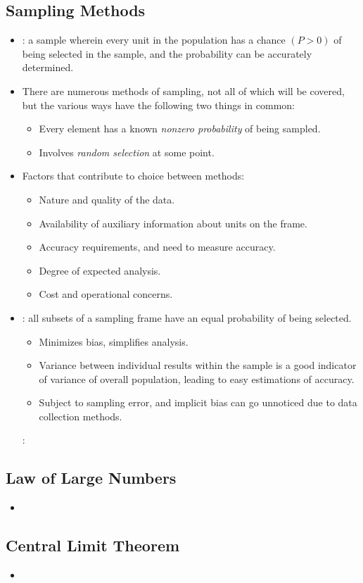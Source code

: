 \begin{itemize}
  \subsection{Sampling Methods}
  \begin{itemize}
    \item {}: a sample wherein every unit in the population has a chance \((P > 0)\) of being selected in the sample, and the probability can be accurately determined.
    \item There are numerous methods of sampling, not all of which will be covered, but the various ways have the following two things in common: 
      \begin{itemize}
        \item Every element has a known \emph{nonzero probability} of being sampled.
        \item Involves \emph{random selection} at some point.
      \end{itemize}
    \item Factors that contribute to choice between methods:
      \begin{itemize}
        \item Nature and quality of the data.
        \item Availability of auxiliary information about units on the frame.
        \item Accuracy requirements, and need to measure accuracy.
        \item Degree of expected analysis.
        \item Cost and operational concerns.
      \end{itemize}
    \item {}: all subsets of a sampling frame have an equal probability of being selected.
      \begin{itemize}
        \item Minimizes bias, simplifies analysis.
        \item Variance between individual results within the sample is a good indicator of variance of overall population, leading to easy estimations of accuracy.
        \item Subject to sampling error, and implicit bias can go unnoticed due to data collection methods.
      \end{itemize}
    :
  \end{itemize}
  
  \subsection{Law of Large Numbers}
  \begin{itemize}
    \item 
  \end{itemize}

  \subsection{Central Limit Theorem}
  \begin{itemize}
    \item 
  \end{itemize}

\end{itemize}
